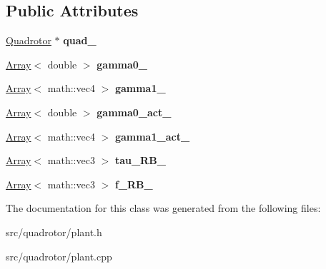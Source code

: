 \subsection*{\-Public \-Attributes}
\begin{DoxyCompactItemize}
\item 
\hypertarget{classPlant_ae068d79c30cca8feb18b3c71d9139568}{\hyperlink{classQuadrotor}{\-Quadrotor} $\ast$ {\bfseries quad\-\_\-}}\label{classPlant_ae068d79c30cca8feb18b3c71d9139568}

\item 
\hypertarget{classPlant_a51a7f6bb5a72b15923eaf338d88ae38b}{\hyperlink{classArray}{\-Array}$<$ double $>$ {\bfseries gamma0\-\_\-}}\label{classPlant_a51a7f6bb5a72b15923eaf338d88ae38b}

\item 
\hypertarget{classPlant_a4c085f84bc488811dcd9accb23cc3924}{\hyperlink{classArray}{\-Array}$<$ math\-::vec4 $>$ {\bfseries gamma1\-\_\-}}\label{classPlant_a4c085f84bc488811dcd9accb23cc3924}

\item 
\hypertarget{classPlant_a581118b2525e2cb4ef3fde8ad84448cd}{\hyperlink{classArray}{\-Array}$<$ double $>$ {\bfseries gamma0\-\_\-act\-\_\-}}\label{classPlant_a581118b2525e2cb4ef3fde8ad84448cd}

\item 
\hypertarget{classPlant_ad4029476cee0fce7bb7c2187cfc5ff64}{\hyperlink{classArray}{\-Array}$<$ math\-::vec4 $>$ {\bfseries gamma1\-\_\-act\-\_\-}}\label{classPlant_ad4029476cee0fce7bb7c2187cfc5ff64}

\item 
\hypertarget{classPlant_a9a8ccde306b87611c82ec5abd886429c}{\hyperlink{classArray}{\-Array}$<$ math\-::vec3 $>$ {\bfseries tau\-\_\-\-R\-B\-\_\-}}\label{classPlant_a9a8ccde306b87611c82ec5abd886429c}

\item 
\hypertarget{classPlant_ab7450e4bff3b3a1963f50ff4b8b39c6c}{\hyperlink{classArray}{\-Array}$<$ math\-::vec3 $>$ {\bfseries f\-\_\-\-R\-B\-\_\-}}\label{classPlant_ab7450e4bff3b3a1963f50ff4b8b39c6c}

\end{DoxyCompactItemize}


\-The documentation for this class was generated from the following files\-:\begin{DoxyCompactItemize}
\item 
src/quadrotor/plant.\-h\item 
src/quadrotor/plant.\-cpp\end{DoxyCompactItemize}

